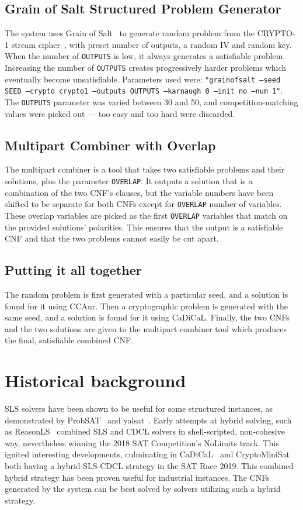 \documentclass[final]{ieee}
\begin{document}
\subsection{Grain of Salt Structured Problem Generator}
The system uses Grain of Salt~\cite{soos2010grain} to generate random problem from the CRYPTO-1 stream cipher~\cite{DBLP:conf/esorics/GarciaGMRVSJ08}, with preset number of outputs, a random IV and random key. When the number of \texttt{OUTPUTS} is low, it always generates a satisfiable problem. Increasing the number of \texttt{OUTPUTS} creates progressively harder problems which eventually become unsatisfiable. Parameters used were: \texttt{"grainofsalt --seed SEED --crypto crypto1 --outputs OUTPUTS --karnaugh 0 --init no --num 1"}. The \texttt{OUTPUTS} parameter was varied between 30 and 50, and competition-matching values were picked out  --- too easy and too hard were discarded.


\subsection{Multipart Combiner with Overlap}
The multipart combiner is a tool that takes two satisfiable problems and their solutions, plus the parameter \texttt{OVERLAP}. It outputs a solution that is a combination of the two CNF's clauses, but the variable numbers have been shifted to be separate for both CNFs except for \texttt{OVERLAP} number of variables. These overlap variables are picked as the first \texttt{OVERLAP} variables that match on the provided solutions' polarities. This ensures that the output is a satisfiable CNF and that the two problems cannot easily be cut apart.

\subsection{Putting it all together}
The random problem is first generated with a particular seed, and a solution is found for it using CCAnr\cite{DBLP:conf/sat/CaiLS15}. Then a cryptographic problem is generated with the same seed, and a solution is found for it using CaDiCaL\cite{biere2018cadical}. Finally, the two CNFs and the two solutions are given to the multipart combiner tool which produces the final, satisfiable combined CNF.


\section{Historical background}
SLS solvers have been shown to be useful for some structured instances, as demonstrated by ProbSAT~\cite{DBLP:conf/sat/BalintS12} and yalsat~\cite{DBLP:conf/sat/BalintBFS14}. Early attempts at hybrid solving, such as ReasonLS~\cite{shaoweixindi} combined SLS and CDCL solvers in shell-scripted, non-cohesive way, nevertheless winning the 2018 SAT Competition's NoLimits track. This ignited interesting developments, culminating in CaDiCaL~\cite{biere2018cadical} and CryptoMiniSat~\cite{CMS} both having a hybrid SLS-CDCL strategy in the SAT Race 2019. This combined hybrid strategy has been proven useful for industrial instances. The CNFs generated by the system can be best solved by solvers utilizing such a hybrid strategy.
\end{document}
